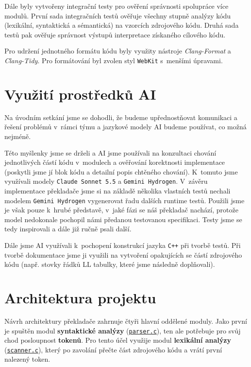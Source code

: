 \documentclass[a4paper, 11pt]{article}
\begin{document}
    Dále byly vytvořeny integrační testy pro ověření správnosti spolupráce více modulů.
    První sada integračních testů ověřuje všechny stupně analýzy kódu (lexikální, syntaktická a sémantická)
    na vzorcích zdrojového kódu. Druhá sada testů pak ověřuje správnost výstupů interpretace získaného cílového kódu.

    Pro udržení jednotného formátu kódu byly využity nástroje \emph{Clang-Format} a \emph{Clang-Tidy}.
    Pro formátování byl zvolen styl \texttt{WebKit} s~menšími úpravami.

    \section{Využití prostředků AI}

    Na úvodním setkání jsme se dohodli, že budeme upřednostňovat komunikaci a řešení problémů v~rámci týmu
    a jazykové modely AI budeme používat, co možná nejméně.

    Této myšlenky jsme se drželi a AI jsme používali na konzultaci chování jednotlivých částí kódu v~modulech a ověřování korektnosti
    implementace (poskytli jsme jí blok kódu a detailní popis chtěného chování). K~tomuto jsme využívali
    modely \texttt{Claude Sonnet 5.5} a \texttt{Gemini Hydrogen}.
    V~závěru implementace překladače jsme si na základě několika vlastních testů nechali modelem \texttt{Gemini Hydrogen}
    vygenerovat řadu dalších runtime testů. Použili jsme je však pouze k~hrubé představě, v~jaké fázi se náš překladač
    nachází, protože model nedokonale pochopil námi předanou testovanou specifikaci.
    Testy jsme se tedy inspirovali a dále již ručně psali další.

    Dále jsme AI využívali k~pochopení konstrukcí jazyka \texttt{C++} při tvorbě testů. Při tvorbě dokumentace jsme ji
    využili na vytvoření opakujících se částí zdrojového kódu (např. stovky řádků LL tabulky, které jsme následně doplňovali).

    \newpage

    \section{Architektura projektu}

        Návrh architektury překladače zahrnuje čtyři hlavní oddělené moduly.
    Jako první je spuštěn modul
    \textbf{syntaktické analýzy} (\hyperref[module:parser]{\texttt{parser.c}}),
    ten ale potřebuje pro svůj chod posloupnost \textbf{tokenů}. Pro tento účel využije modul
    \textbf{lexikální analýzy} (\hyperref[module:scanner]{\texttt{scanner.c}}),
    který po zavolání přečte část zdrojového kódu a vrátí první nalezený token.
\end{document}
